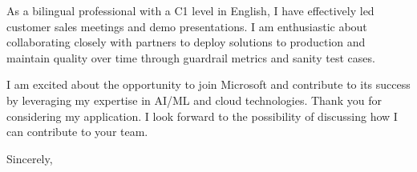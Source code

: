 \documentclass[11pt,a4paper,roman]{moderncv}
\begin{document}
As a bilingual professional with a C1 level in English, 
I have effectively led customer sales meetings and demo 
presentations. I am enthusiastic about collaborating 
closely with partners to deploy solutions to production 
and maintain quality over time through guardrail metrics 
and sanity test cases.

I am excited about the opportunity to join Microsoft and 
contribute to its success by leveraging my expertise in AI/ML 
and cloud technologies. Thank you for considering my application. 
I look forward to the possibility of discussing how I can 
contribute to your team.

Sincerely,
\makeletterclosing
\end{document}

